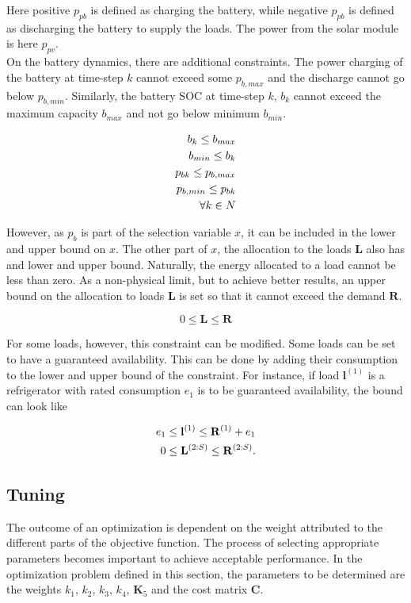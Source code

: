 Here positive $p_{pb}$ is defined as charging the battery, while negative $p_{pb}$ is defined as discharging the battery to supply the loads. The power from the solar module is here $p_{pv}$.\\

On the battery dynamics, there are additional constraints. The power charging of the battery at time-step $k$ cannot exceed some $p_{b,max}$ and the discharge cannot go below $p_{b,min}$. Similarly, the battery SOC at time-step $k$, $b_k$ cannot exceed the maximum capacity $b_{max}$ and not go below minimum $b_{min}$. 

\begin{align}
    b_k \leq b_{max}\\
    b_{min} \leq b_k\\
    p_{bk} \leq p_{b,max}\\
    p_{b,min} \leq p_{bk}\\
    \forall k \in N \notag
\end{align}

However, as $p_b$ is part of the selection variable $x$, it can be included in the lower and upper bound on $x$. The other part of $x$, the allocation to the loads $\mathbf{L}$ also has and lower and upper bound. Naturally, the energy allocated to a load cannot be less than zero. As a non-physical limit, but to achieve better results, an upper bound on the allocation to loads $\mathbf{L}$ is set so that it cannot exceed the demand $\mathbf{R}$. 

\begin{equation}
    0 \leq \mathbf{L} \leq \mathbf{R}
\end{equation}

For some loads, however, this constraint can be modified. Some loads can be set to have a guaranteed availability. This can be done by adding their consumption to the lower and upper bound of the constraint. For instance, if load $\mathbf{l}^{(1)}$ is a refrigerator with rated consumption $e_1$ is to be guaranteed availability, the bound can look like

\begin{align}
    e_1 &\leq \mathbf{l}^{(1)} \leq \mathbf{R}^{(1)} + e_1\notag\\
    0 &\leq \mathbf{L}^{(2:S)} \leq \mathbf{R}^{(2:S)}.   
\end{align}

\subsection{Tuning}
The outcome of an optimization is dependent on the weight attributed to the different parts of the objective function. The process of selecting appropriate parameters becomes important to achieve acceptable performance. In the optimization problem defined in this section, the parameters to be determined are the weights $k_1$, $k_2$, $k_3$, $k_4$, $\mathbf{K}_5$ and the cost matrix \textbf{C}.\\ 

